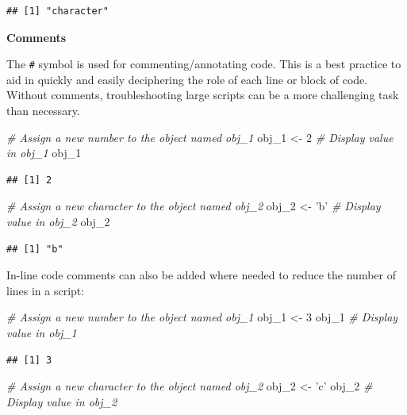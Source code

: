 \documentclass[]{book}
\newenvironment{Shaded}{\begin{snugshade}}{\end{snugshade}}
\newcommand{\CommentTok}[1]{\textcolor[rgb]{0.56,0.35,0.01}{\textit{#1}}}
\newcommand{\DecValTok}[1]{\textcolor[rgb]{0.00,0.00,0.81}{#1}}
\newcommand{\NormalTok}[1]{#1}
\newcommand{\StringTok}[1]{\textcolor[rgb]{0.31,0.60,0.02}{#1}}
\begin{document}
\begin{verbatim}
## [1] "character"
\end{verbatim}

\textbf{Comments}

The \texttt{\#} symbol is used for commenting/annotating code. This is a best practice to aid in quickly and easily deciphering the role of each line or block of code. Without comments, troubleshooting large scripts can be a more challenging task than necessary.

\begin{Shaded}
\begin{Highlighting}[]
\CommentTok{# Assign a new number to the object named obj_1}
\NormalTok{obj_}\DecValTok{1}\NormalTok{ <-}\StringTok{ }\DecValTok{2}
\CommentTok{# Display value in obj_1}
\NormalTok{obj_}\DecValTok{1}
\end{Highlighting}
\end{Shaded}

\begin{verbatim}
## [1] 2
\end{verbatim}

\begin{Shaded}
\begin{Highlighting}[]
\CommentTok{# Assign a new character to the object named obj_2}
\NormalTok{obj_}\DecValTok{2}\NormalTok{ <-}\StringTok{ 'b'}
\CommentTok{# Display value in obj_2}
\NormalTok{obj_}\DecValTok{2}
\end{Highlighting}
\end{Shaded}

\begin{verbatim}
## [1] "b"
\end{verbatim}

In-line code comments can also be added where needed to reduce the number of lines in a script:

\begin{Shaded}
\begin{Highlighting}[]
\CommentTok{# Assign a new number to the object named obj_1}
\NormalTok{obj_}\DecValTok{1}\NormalTok{ <-}\StringTok{ }\DecValTok{3}
\NormalTok{obj_}\DecValTok{1} \CommentTok{# Display value in obj_1}
\end{Highlighting}
\end{Shaded}

\begin{verbatim}
## [1] 3
\end{verbatim}

\begin{Shaded}
\begin{Highlighting}[]
\CommentTok{# Assign a new character to the object named obj_2}
\NormalTok{obj_}\DecValTok{2}\NormalTok{ <-}\StringTok{ 'c'} 
\NormalTok{obj_}\DecValTok{2} \CommentTok{# Display value in obj_2}
\end{Highlighting}
\end{Shaded}
\end{document}
